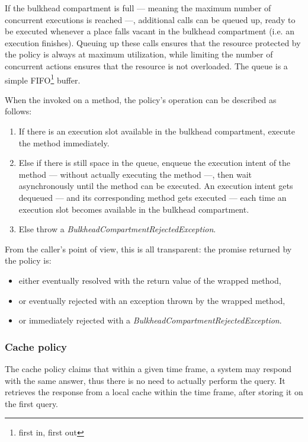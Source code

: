 If the bulkhead compartment is full — meaning the maximum number of concurrent executions is reached —, additional calls can be queued up, ready to be executed whenever a place falls vacant in the bulkhead compartment (i.e. an execution finishes). Queuing up these calls ensures that the resource protected by the policy is always at maximum utilization, while limiting the number of concurrent actions ensures that the resource is not overloaded. The queue is a simple FIFO\footnote{first in, first out} buffer.

When the invoked on a method, the policy's operation can be described as follows:

\begin{enumerate}
\item If there is an execution slot available in the bulkhead compartment, execute the method immediately.
\item Else if there is still space in the queue, enqueue the execution intent of the method — without actually executing the method —, then wait asynchronously until the method can be executed. An execution intent gets dequeued — and its corresponding method gets executed — each time an execution slot becomes available in the bulkhead compartment.
\item Else throw a \emph{BulkheadCompartmentRejectedException}.
\end{enumerate}

From the caller's point of view, this is all transparent: the promise returned by the policy is:

\begin{itemize}
\item either eventually resolved with the return value of the wrapped method,
\item or eventually rejected with an exception thrown by the wrapped method,
\item or immediately rejected with a \emph{BulkheadCompartmentRejectedException}.
\end{itemize}

\subsubsection{Cache policy}

The cache policy claims that within a given time frame, a system may respond with the same answer, thus there is no need to actually perform the query. It retrieves the response from a local cache within the time frame, after storing it on the first query.

